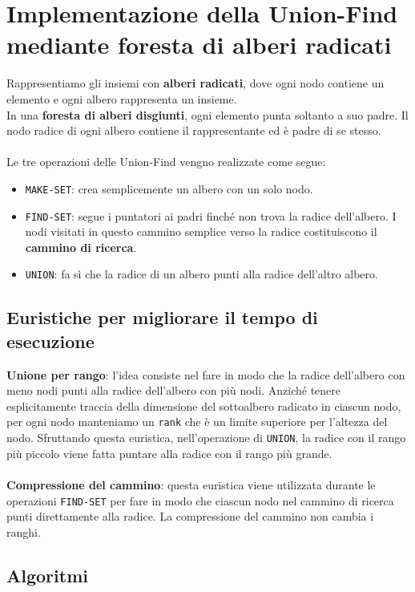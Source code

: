 \section{Implementazione della Union-Find mediante foresta di alberi radicati}
Rappresentiamo gli insiemi con \textbf{alberi radicati}, dove ogni nodo contiene un elemento e ogni albero rappresenta un insieme.\\
In una \textbf{foresta di alberi disgiunti}, ogni elemento punta soltanto a suo padre. Il nodo radice di ogni albero contiene il rappresentante ed è padre di se stesso.\\\\
Le tre operazioni delle Union-Find vengno realizzate come segue:
    \begin{itemize}
        \item{\texttt{MAKE-SET}: crea semplicemente un albero con un solo nodo.}
        \item{\texttt{FIND-SET}: segue i puntatori ai padri finché non trova la radice dell'albero. I nodi visitati in questo cammino semplice verso la radice costituiscono il \textbf{cammino di ricerca}.}
        \item{\texttt{UNION}: fa sì che la radice di un albero punti alla radice dell'altro albero.}
    \end{itemize}

\subsection{Euristiche per migliorare il tempo di esecuzione}
\textbf{Unione per rango}: l'idea consiste nel fare in modo che la radice dell'albero con meno nodi punti alla radice dell'albero con più nodi. Anziché tenere esplicitamente traccia della dimensione del sottoalbero radicato in ciascun nodo, per ogni nodo manteniamo un \texttt{rank} che è un limite superiore per l'altezza del nodo. Sfruttando questa euristica, nell'operazione di \texttt{UNION}, la radice con il rango più piccolo viene fatta puntare alla radice con il rango più grande.\\\\
\textbf{Compressione del cammino}: questa euristica viene utilizzata durante le operazioni \texttt{FIND-SET} per fare in modo che ciascun nodo nel cammino di ricerca punti direttamente alla radice. La compressione del cammino non cambia i ranghi.

\subsection{Algoritmi}
